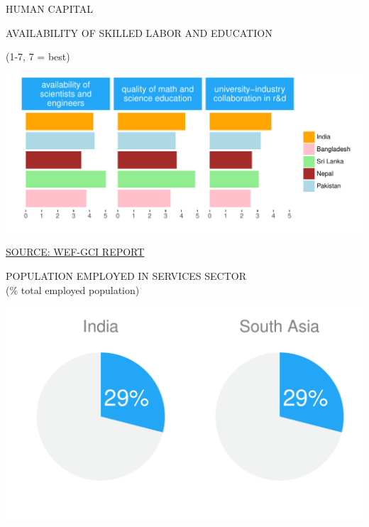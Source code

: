 \documentclass{article}\usepackage[]{graphicx}\usepackage[]{color}
\makeatletter
\def\maxwidth{ %
  \ifdim\Gin@nat@width>\linewidth
    \linewidth
  \else
    \Gin@nat@width
  \fi
}
\makeatother
\begin{document}

\begin{minipage}[b]{0.95\textwidth}
   \vspace{5ex}
   \begin{flushleft}  
     \hspace{4ex}\Large{\textcolor[HTML]{22A6F5}{HUMAN CAPITAL}}
   \end{flushleft} 
  \begin{minipage}[c]{0.55\textwidth} %
    \hspace{4ex}\small{\textcolor[HTML]{818181}{AVAILABILITY OF SKILLED LABOR AND EDUCATION}} 
    
    \hspace{4ex}\footnotesize{\textcolor[HTML]{818181}{(1-7, 7 = best)}}


\hfill{}\includegraphics[width=\maxwidth]{figure/bar_facewrap_chart_Human-1} 



    \hspace{4ex}\scriptsize{\href{http://www3.weforum.org/docs/gcr/2015-2016/GCI_Dataset_2006-2015.xlsx}{\textcolor[HTML]{22A6F5}{SOURCE: WEF-GCI REPORT}}}
  \end{minipage}
  \begin{minipage}[c]{0.43\textwidth} %
    \small{\textcolor[HTML]{818181}{POPULATION EMPLOYED IN SERVICES SECTOR \\ \footnotesize(\% total employed population)}}
    \vspace*{-0.6cm}


{\centering \includegraphics[width=\maxwidth]{figure/pie_chart_double_Human-1} 

}
\end{minipage}
\end{minipage}
\end{document}
